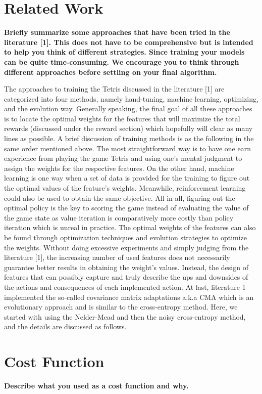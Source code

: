 \documentclass[12pt,letterpaper]{article}
\begin{document}
\section{Related Work}
\textbf{Briefly summarize some approaches that have been tried in the literature [1]. This does not have to be comprehensive but is intended to help you think of different strategies. Since training your models can be quite time-consuming. We encourage you to think through different approaches before settling on your final algorithm.}

The approaches to training the Tetris discussed in the literature [1] are categorized into four methods, namely hand-tuning, machine learning, optimizing, and the evolution way. Generally speaking, the final goal of all these approaches is to locate the optimal weights for the features that will maximize the total rewards (discussed under the reward section) which hopefully will clear as many lines as possible. A brief discussion of training methods is as the following in the same order mentioned above. The most straightforward way is to have one earn experience from playing the game Tetris and using one's mental judgment to assign the weights for the respective features. On the other hand, machine learning is one way when a set of data is provided for the training to figure out the optimal values of the feature's weights. Meanwhile, reinforcement learning could also be used to obtain the same objective. All in all, figuring out the optimal policy is the key to scoring the game instead of evaluating the value of the game state as value iteration is comparatively more costly than policy iteration which is unreal in practice. The optimal weights of the features can also be found through optimization techniques and evolution strategies to optimize the weights. Without doing excessive experiments and simply judging from the literature [1], the increasing number of used features does not necessarily guarantee better results in obtaining the weight's values. Instead, the design of features that can possibly capture and truly describe the ups and downsides of the actions and consequences of each implemented action. At last, literature 1 implemented the so-called covariance matrix adaptations a.k.a CMA which is an evolutionary approach and is similar to the cross-entropy method. Here, we started with using the Nelder-Mead and then the noisy cross-entropy method, and the details are discussed as follows.

\section{Cost Function}
\textbf{Describe what you used as a cost function and why.}
\end{document}
